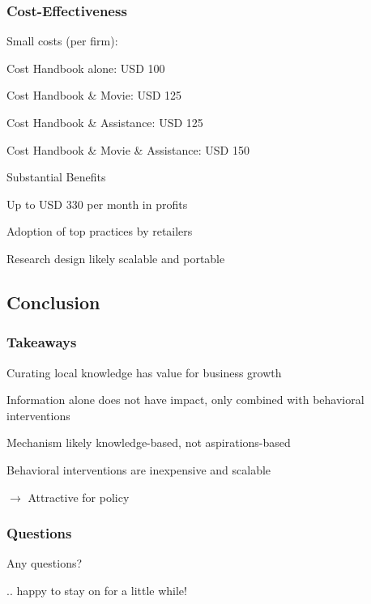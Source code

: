\documentclass[hideothersubsections, usenames,dvipsnames,11pt]{beamer}
\newenvironment{itemize_2pt}{\itemize\addtolength{\itemsep}{2pt}}{\enditemize}
\begin{document}
\begin{frame}
\frametitle{Cost-Effectiveness}

\textcolor{bdf}{Small costs (per firm)}:
\begin{itemize_2pt}
\item Cost Handbook alone: USD 100
\item Cost Handbook \& Movie: USD 125
\item Cost Handbook \& Assistance: USD 125
\item Cost Handbook \& Movie \& Assistance: USD 150
\end{itemize_2pt}
\vspace{0.5em}

\textcolor{bdf}{Substantial Benefits}
\begin{itemize_2pt}
\item Up to USD 330 per month in profits
\item Adoption of top practices by retailers
\end{itemize_2pt}

\vspace{0.5em}
Research design likely \textcolor{bdf}{scalable and portable}

\end{frame}

\subsection{Conclusion}
\begin{frame}
\frametitle{Takeaways}
\begin{itemize_2pt}
    \item \textcolor{bdf}{Curating local knowledge has value for business growth} 
    \item Information alone does not have impact, only combined with \textcolor{bdf}{behavioral interventions}
    \item Mechanism likely \textcolor{bdf}{knowledge-based}, not aspirations-based
	\item Behavioral interventions are \textcolor{bdf}{inexpensive and scalable}
	\item[] $\rightarrow$  Attractive for policy
    
\end{itemize_2pt}
\end{frame}


\begin{frame}
\frametitle{Questions}

\textcolor{bdf}{Any questions?}
\begin{itemize_2pt}
    \item[] .. happy to stay on for a little while!
\end{itemize_2pt}
\end{frame}
\end{document}

